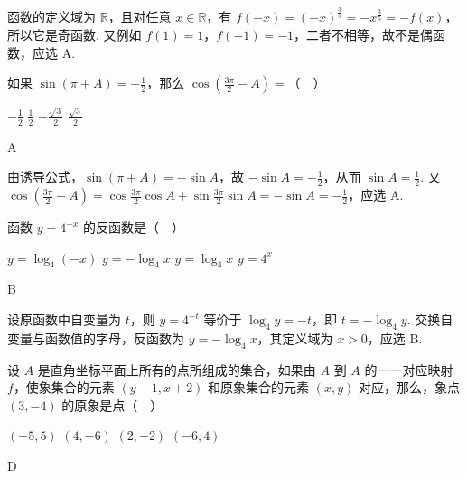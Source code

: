 \documentclass[UTF8,a4paper,oneside,11pt]{ctexbook}
\begin{document}
\begin{solution}
函数的定义域为 \(\mathbb{R}\)，且对任意 \(x\in\mathbb{R}\)，有 \(f(-x)=(-x)^{\frac{3}{5}}=-x^{\frac{3}{5}}=-f(x)\)，所以它是奇函数. 又例如 \(f(1)=1\)，\(f(-1)=-1\)，二者不相等，故不是偶函数，应选 A.
\end{solution}

\begin{problem}
如果 \(\sin\left( \pi+A \right)=-\frac{1}{2}\)，那么 \(\cos\left( \frac{3\pi}{2}-A \right)=\)（\(\quad\)）

\choices
    {\(-\frac{1}{2}\)}
    {\(\frac{1}{2}\)}
    {\(-\frac{\sqrt{3}}{2}\)}
    {\(\frac{\sqrt{3}}{2}\)}
\end{problem}

\begin{answer}
A
\end{answer}

\begin{solution}
由诱导公式，\(\sin(\pi+A)=-\sin A\)，故 \(-\sin A=-\frac12\)，从而 \(\sin A=\frac12\). 又
\(\cos\left(\frac{3\pi}{2}-A\right)=\cos\frac{3\pi}{2}\cos A+\sin\frac{3\pi}{2}\sin A=-\sin A=-\frac12\)，应选 A.
\end{solution}

\begin{problem}
函数 \(y=4^{-x}\) 的反函数是（\(\quad\)）

\choices
    {\(y=\log_4\left( -x \right)\)}
    {\(y=-\log_4 x\)}
    {\(y=\log_4 x\)}
    {\(y=4^x\)}
\end{problem}

\begin{answer}
B
\end{answer}

\begin{solution}
设原函数中自变量为 \(t\)，则 \(y=4^{-t}\) 等价于 \(\log_4 y=-t\)，即 \(t=-\log_4 y\). 交换自变量与函数值的字母，反函数为 \(y=-\log_4 x\)，其定义域为 \(x>0\)，应选 B.
\end{solution}

\begin{problem}
设 \(A\) 是直角坐标平面上所有的点所组成的集合，如果由 \(A\) 到 \(A\) 的一一对应映射 \(f\)，使象集合的元素 \(\left( y-1,x+2 \right)\) 和原象集合的元素 \(\left( x,y \right)\) 对应，那么，象点 \((3,-4)\) 的原象是点（\(\quad\)）

\choices
    {\((-5,5)\)}
    {\((4,-6)\)}
    {\((2,-2)\)}
    {\((-6,4)\)}
\end{problem}

\begin{answer}
D
\end{answer}
\end{document}
